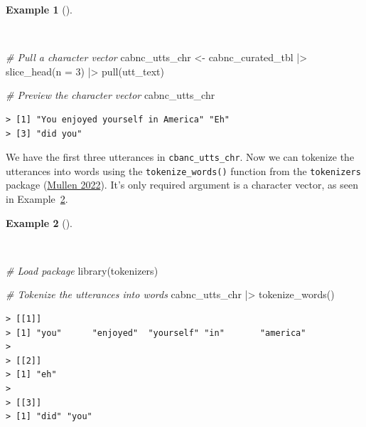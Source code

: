\documentclass[
  letterpaper,
  DIV=11,
  numbers=noendperiod]{scrreport}
\newenvironment{Shaded}{\begin{snugshade}}{\end{snugshade}}
\newcommand{\AttributeTok}[1]{\textcolor[rgb]{0.00,0.00,0.00}{#1}}
\newcommand{\CommentTok}[1]{\textcolor[rgb]{0.00,0.00,0.00}{\textit{#1}}}
\newcommand{\DecValTok}[1]{\textcolor[rgb]{0.00,0.00,0.00}{#1}}
\newcommand{\FunctionTok}[1]{\textcolor[rgb]{0.00,0.00,0.00}{#1}}
\newcommand{\NormalTok}[1]{\textcolor[rgb]{0.00,0.00,0.00}{#1}}
\newcommand{\OtherTok}[1]{\textcolor[rgb]{0.00,0.00,0.00}{#1}}
\newcommand{\SpecialCharTok}[1]{\textcolor[rgb]{0.00,0.00,0.00}{#1}}
\theoremstyle{definition}
\newtheorem{example}{Example}[chapter]
\theoremstyle{remark}
\begin{document}
\begin{example}[]\protect\hypertarget{exm-td-cabnc-tokenization-words-vector}{}\label{exm-td-cabnc-tokenization-words-vector}

~

\begin{Shaded}
\begin{Highlighting}[]
\CommentTok{\# Pull a character vector}
\NormalTok{cabnc\_utts\_chr }\OtherTok{\textless{}{-}} 
\NormalTok{  cabnc\_curated\_tbl }\SpecialCharTok{|\textgreater{}}
  \FunctionTok{slice\_head}\NormalTok{(}\AttributeTok{n =} \DecValTok{3}\NormalTok{) }\SpecialCharTok{|\textgreater{}}
  \FunctionTok{pull}\NormalTok{(utt\_text)}

\CommentTok{\# Preview the character vector}
\NormalTok{cabnc\_utts\_chr}
\end{Highlighting}
\end{Shaded}

\begin{verbatim}
> [1] "You enjoyed yourself in America" "Eh"                             
> [3] "did you"
\end{verbatim}

\end{example}

We have the first three utterances in \texttt{cbanc\_utts\_chr}. Now we
can tokenize the utterances into words using the
\texttt{tokenize\_words()} function from the \texttt{tokenizers} package
(\protect\hyperlink{ref-R-tokenizers}{Mullen 2022}). It's only required
argument is a character vector, as seen in
Example~\ref{exm-td-cabnc-tokenization-words-tokenize}.

\begin{example}[]\protect\hypertarget{exm-td-cabnc-tokenization-words-tokenize}{}\label{exm-td-cabnc-tokenization-words-tokenize}

~

\begin{Shaded}
\begin{Highlighting}[]
\CommentTok{\# Load package}
\FunctionTok{library}\NormalTok{(tokenizers)}

\CommentTok{\# Tokenize the utterances into words}
\NormalTok{cabnc\_utts\_chr }\SpecialCharTok{|\textgreater{}} 
  \FunctionTok{tokenize\_words}\NormalTok{()}
\end{Highlighting}
\end{Shaded}

\begin{verbatim}
> [[1]]
> [1] "you"      "enjoyed"  "yourself" "in"       "america" 
> 
> [[2]]
> [1] "eh"
> 
> [[3]]
> [1] "did" "you"
\end{verbatim}

\end{example}
\end{document}
